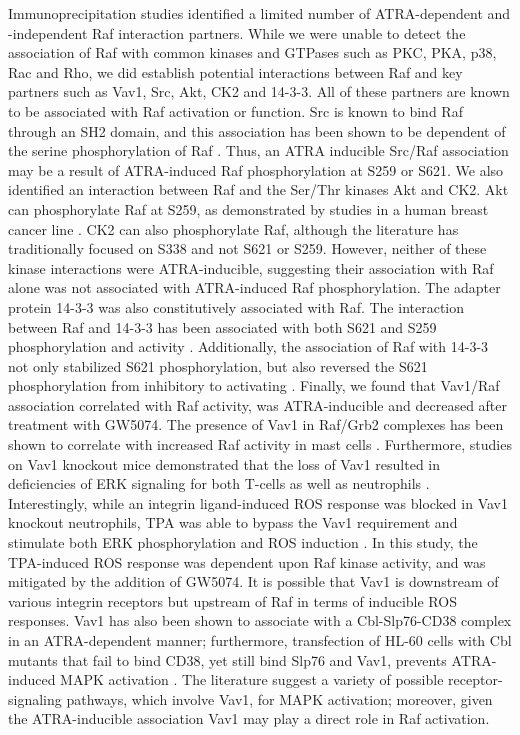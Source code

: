 \documentclass[12pt]{article}
\begin{document}
Immunoprecipitation studies identified a limited number of ATRA-dependent and -independent Raf interaction partners.
While we were unable to detect the association of Raf with common kinases and GTPases such as PKC, PKA, p38, Rac and Rho,
we did establish potential interactions between Raf and key partners such as Vav1, Src, Akt, CK2 and 14-3-3.
All of these partners are known to be associated with Raf activation or function.
Src is known to bind Raf through an SH2 domain, and this association has been shown to be dependent of the serine phosphorylation of Raf \cite{Cleghon1994}.
Thus, an ATRA inducible Src/Raf association may be a result of ATRA-induced Raf phosphorylation at S259 or S621.
We also identified an interaction between Raf and the Ser/Thr kinases Akt and CK2.
Akt can phosphorylate Raf at S259, as demonstrated by studies in a human breast cancer line \cite{Zimmermann1999}.
CK2 can also phosphorylate Raf, although the literature has traditionally focused on S338 and not S621 or S259\cite{Ritt2007}.
However, neither of these kinase interactions were ATRA-inducible, suggesting their association with Raf alone was not associated with ATRA-induced Raf phosphorylation.
The adapter protein 14-3-3 was also constitutively associated with Raf.
The interaction between Raf and 14-3-3 has been associated with both S621 and S259 phosphorylation and activity \cite{Hekman2004}.
Additionally, the association of Raf with 14-3-3 not only stabilized S621 phosphorylation,
but also reversed the S621 phosphorylation from inhibitory to activating \cite{Dhillon2009}.
Finally, we found that Vav1/Raf association correlated with Raf activity, was ATRA-inducible and decreased after treatment with GW5074.
The presence of Vav1 in Raf/Grb2 complexes has been shown to correlate with increased Raf activity in mast cells \cite{Song1996}.
Furthermore, studies on Vav1 knockout mice demonstrated that the loss of Vav1 resulted in deficiencies
of ERK signaling for both T-cells as well as neutrophils \cite{Costello1999,Graham2007}.
Interestingly, while an integrin ligand-induced ROS response was blocked in Vav1 knockout neutrophils,
TPA was able to bypass the Vav1 requirement and stimulate both ERK phosphorylation and ROS induction \cite{Graham2007}.
In this study, the TPA-induced ROS response was dependent upon Raf kinase activity, and was mitigated by the addition of GW5074.
It is possible that Vav1 is downstream of various integrin receptors but upstream of Raf in terms of inducible ROS responses.
Vav1 has also been shown to associate with a Cbl-Slp76-CD38 complex in an ATRA-dependent manner;
furthermore, transfection of HL-60 cells with Cbl mutants that fail to bind CD38, yet still bind Slp76 and Vav1, prevents
ATRA-induced MAPK activation \cite{Shen:2009aa}.
The literature suggest a variety of possible receptor-signaling pathways, which involve Vav1, for MAPK activation; moreover,
given the ATRA-inducible association Vav1 may play a direct role in Raf activation.
\end{document}
